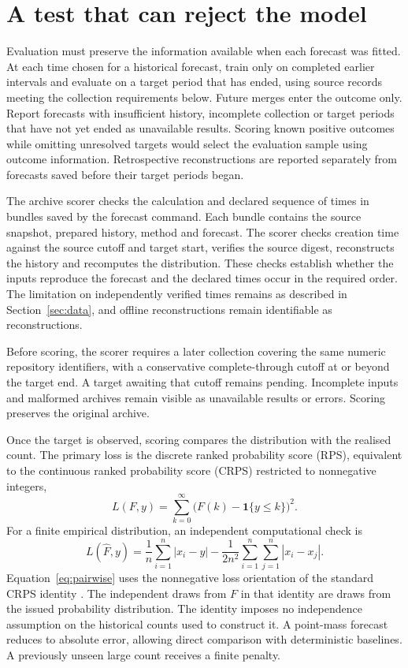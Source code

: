 \documentclass[11pt,a4paper]{article}
\newcommand{\ind}{\mathbf{1}}
\begin{document}
\section{A test that can reject the model}
\label{sec:evaluation}

Evaluation must preserve the information available when each forecast was fitted. At each time chosen for a historical forecast, train only on completed earlier intervals and evaluate on a target period that has ended, using source records meeting the collection requirements below. Future merges enter the outcome only. Report forecasts with insufficient history, incomplete collection or target periods that have not yet ended as unavailable results. Scoring known positive outcomes while omitting unresolved targets would select the evaluation sample using outcome information. Retrospective reconstructions are reported separately from forecasts saved before their target periods began.

The archive scorer checks the calculation and declared sequence of times in bundles saved by the forecast command. Each bundle contains the source snapshot, prepared history, method and forecast. The scorer checks creation time against the source cutoff and target start, verifies the source digest, reconstructs the history and recomputes the distribution. These checks establish whether the inputs reproduce the forecast and the declared times occur in the required order. The limitation on independently verified times remains as described in Section~\ref{sec:data}, and offline reconstructions remain identifiable as reconstructions.

Before scoring, the scorer requires a later collection covering the same numeric repository identifiers, with a conservative complete-through cutoff at or beyond the target end. A target awaiting that cutoff remains pending. Incomplete inputs and malformed archives remain visible as unavailable results or errors. Scoring preserves the original archive.

Once the target is observed, scoring compares the distribution with the realised count. The primary loss is the discrete ranked probability score (RPS), equivalent to the continuous ranked probability score (CRPS) restricted to nonnegative integers,
\begin{equation}
 L(F,y)=\sum_{k=0}^{\infty}\bigl(F(k)-\ind\{y\leq k\}\bigr)^2.
 \label{eq:rps}
\end{equation}
For a finite empirical distribution, an independent computational check is
\begin{equation}
 L(\widehat F,y)=\frac1n\sum_{i=1}^n|x_i-y|
 -\frac{1}{2n^2}\sum_{i=1}^n\sum_{j=1}^n|x_i-x_j|.
 \label{eq:pairwise}
\end{equation}
Equation~\eqref{eq:pairwise} uses the nonnegative loss orientation of the standard CRPS identity \citep[Section 4.2]{gneiting2007}. The independent draws from $F$ in that identity are draws from the issued probability distribution. The identity imposes no independence assumption on the historical counts used to construct it. A point-mass forecast reduces to absolute error, allowing direct comparison with deterministic baselines. A previously unseen large count receives a finite penalty.
\end{document}
